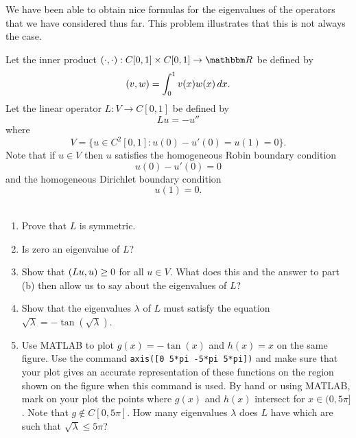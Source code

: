 
We have been able to obtain nice formulas for the eigenvalues of the operators that we have considered thus far. This problem illustrates that this is not always the case.

Let the inner product $\ip{\cdot,\cdot}:C[0,1]\times C[0,1]\to\R$ be defined by
\[
(v,w)=\int_0^1v(x)w(x)\,dx.
\]
Let the linear operator $L: V\to C[0,1]$ be defined by
\[
Lu = -u''
\]
where
\[ V = \{u\in C^2[0,1]:  u(0)-u'(0)=u(1)=0\}.\]
Note that if $u\in V$ then $u$ satisfies the homogeneous Robin boundary condition
\[ u(0) - u'(0) = 0\]
and the homogeneous Dirichlet boundary condition
\[ u(1) = 0.\]
\\
\begin{enumerate}
\item Prove that $L$ is symmetric.
\\
\item Is zero an eigenvalue of $L$?
\\
\item Show that $(Lu,u)\ge0$ for all $u\in V$. What does this and the answer to part (b) then allow us to say about the eigenvalues of $L$?
\\
\item Show that the eigenvalues $\lambda$ of $L$ must satisfy the equation $\sqrt{\lambda} = - \tan(\sqrt{\lambda})$.
\\
\item Use MATLAB to plot $g(x) = -\tan(x)$ and $h(x)=x$ on the same figure. Use the command \verb|axis([0 5*pi -5*pi 5*pi])| and make sure that your plot gives an accurate representation of these functions on the region shown on the figure when this command is used. By hand or using MATLAB, mark on your plot the points where $g(x)$ and $h(x)$ intersect for $x\in(0,5\pi]$. Note that $g\notin C[0, 5\pi]$. How many eigenvalues $\lambda$ does $L$ have which are such that $\sqrt{\lambda}\le 5\pi$?
\end{enumerate}




